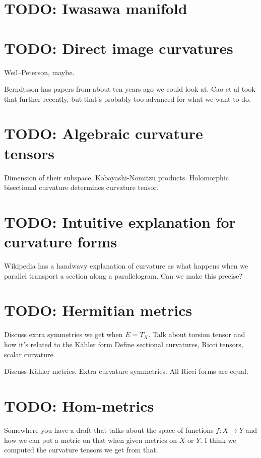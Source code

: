 \documentclass[11pt]{article}
\begin{document}
\section{TODO: Iwasawa manifold}
\label{sec:orgd67c2ff}

\section{TODO: Direct image curvatures}
\label{sec:org5619e67}

Weil--Peterson, maybe.

Berndtsson has papers from about ten years ago we could look at. Cao et al took that further recently, but that's probably too advanced for what we want to do.


\section{TODO: Algebraic curvature tensors}
\label{sec:orga0722e9}

Dimension of their subspace.
Kobayashi-Nomitzu products.
Holomorphic bisectional curvature determines curvature tensor.


\section{TODO: Intuitive explanation for curvature forms}
\label{sec:org2b43ecb}

Wikipedia has a handwavy explanation of curvature as what happens when we parallel transport a section along a parallelogram. Can we make this precise?



\section{TODO: Hermitian metrics}
\label{sec:orgad8dbb1}

Discuss extra symmetries we get when \(E = T_X\).
Talk about torsion tensor and how it's related to the K\"ahler form
Define sectional curvatures, Ricci tensors, scalar curvature.

Discuss K\"ahler metrics. Extra curvature symmetries. All Ricci forms are equal.


\section{TODO: Hom-metrics}

Somewhere you have a draft that talks about the space of functions $f : X \to Y$ and how we can put a metric on that when given metrics on $X$ or $Y$. I think we computed the curvature tensors we get from that.
\end{document}
